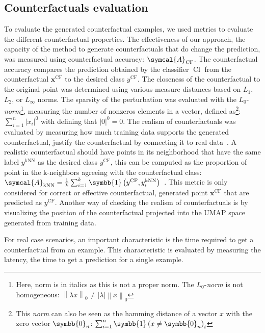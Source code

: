 \documentclass[../main.tex]{subfiles}
\begin{document}
	\subsection{Counterfactuals evaluation}
		To evaluate the generated counterfactual examples, we used metrics to evaluate the different counterfactual properties.
		The effectiveness of our approach, \ie{}the capacity of the method to generate counterfactuals that do change the prediction, was measured using counterfactual accuracy: \(\symcal{A}_{\text{CF}}\).
		The counterfactual accuracy compares the prediction obtained by the classifier \(\operatorname{Cl}\) from the counterfactual \(\symbf{x}^{\text{CF}}\) to the desired class \(y^{\text{CF}}\).
		The closeness of the counterfactual to the original point was determined using various measure distances based on \(L_{1}\), \(L_{2}\), or \(L_{\infty}\) norms.
		The sparsity of the perturbation was evaluated with the \(L_{0}\)-\textit{norm}\footnote{Here, norm is in italics as this is not a proper norm. The \(L_{0}\)-\textit{norm} is not homogeneous: \(\left\|\lambda x \right\|_{0} \neq \left|\lambda\right| \left\| x \right\|_{0}\)}, measuring the number of nonzeros elements in a vector, defined as\footnote{This \textit{norm} can also be seen as the hamming distance of a vector \(x\) with the zero vector \(\symbb{0}_{n}\): \(\sum_{i=1}^{n} \symbb{1}\left(x \neq \symbb{0}_{n}\right)_{i}\)}: \(\sum_{i=1}^{n} \left|x_{i}\right|^{0}\) with defining that \(\left|0\right|^{0}=0\).
		The realism of counterfactuals was evaluated by measuring how much training data supports the generated counterfactual, \ie{} justify the counterfactual by connecting it to real data~\cite{JustifyCF}.
		A realistic counterfactual should have points in its neighborhood that have the same label \( y^{\text{kNN}}\) as the desired class \(y^{\text{CF}}\), this can be computed as the proportion of point in the k-neighbors agreeing with the counterfactual class: \(\symcal{A}_{\text{kNN}} = \frac{1}{k}\sum_{i=1}^{k}\symbb{1}\left(y^{\text{CF}},  y^{\text{kNN}}_{i}\right)\)~\cite{Carla_CF}.
		This metric is only considered for correct or effective counterfactual, generated point \(\symbf{x}^{\text{CF}}\) that are predicted as \(y^{\text{CF}}\).
		Another way of checking the realism of counterfactuals is by visualizing the position of the counterfactual projected into the UMAP space generated from training data.

		For real case scenarios, an important characteristic is the time required to get a counterfactual from an example.
		This characteristic is evaluated by measuring the latency, the time to get a prediction for a single example.
\end{document}
